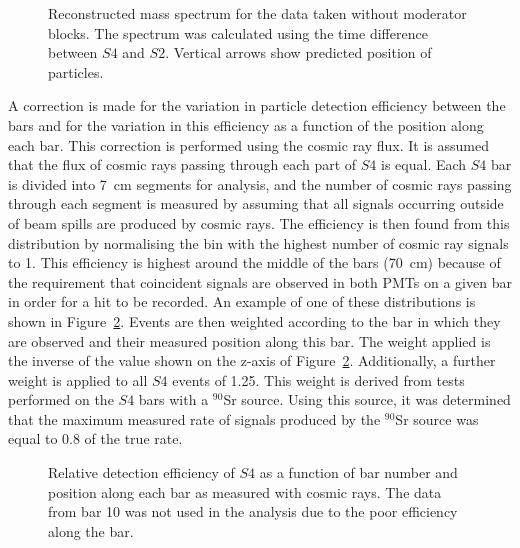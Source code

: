 \begin{figure}[h]
  \centering
  \begin{adjustbox}{max totalsize={.83\textwidth}{.5\textheight},center}
    
  \end{adjustbox}
  \caption{Reconstructed mass spectrum for the data taken without moderator blocks. The spectrum was calculated using the time difference between $\mathit{S4}$ and $\mathit{S2}$. Vertical arrows show predicted position of particles.}
  \label{fig:s4tof_mass}
\end{figure}

A correction is made for the variation in particle detection efficiency between the bars and for the variation in this efficiency as a function of the position along each bar.
This correction is performed using the cosmic ray flux.
It is assumed that the flux of cosmic rays passing through each part of $\mathit{S4}$ is equal.
Each $\mathit{S4}$ bar is divided into 7~cm segments for analysis, and the number of cosmic rays passing through each segment is measured by assuming that all signals occurring outside of beam spills are produced by cosmic rays.
The efficiency is then found from this distribution by normalising the bin with the highest number of cosmic ray signals to 1.
This efficiency is highest around the middle of the bars (70~cm) because of the requirement that coincident signals are observed in both PMTs on a given bar in order for a hit to be recorded.
An example of one of these distributions is shown in Figure~\ref{fig:s4PosEff}.
Events are then weighted according to the bar in which they are observed and their measured position along this bar.
The weight applied is the inverse of the value shown on the z-axis of Figure~\ref{fig:s4PosEff}.
Additionally, a further weight is applied to all $\mathit{S4}$ events of 1.25.
This weight is derived from tests performed on the $\mathit{S4}$ bars with a $^{90}$Sr source.
Using this source, it was determined that the maximum measured rate of signals produced by the $^{90}$Sr source was equal to 0.8 of the true rate.

\begin{figure}
  \begin{adjustbox}{width=.65\textwidth, center}
    
  \end{adjustbox}
  \caption{Relative detection efficiency of $\mathit{S4}$ as a function of bar number and position along each bar as measured with cosmic rays. The data from bar 10 was not used in the analysis due to the poor efficiency along the bar.}
  \label{fig:s4PosEff}
\end{figure}

